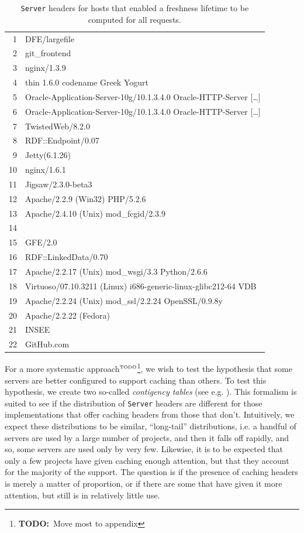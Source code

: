 \documentclass{llncs}
\newcommand{\httph}[1]{\texttt{#1}}
\newcommand{\todo}[1]{\ensuremath{^{\textrm{\tiny{TODO}\normalsize}}}\footnote{\textbf{TODO:}~#1}}
\begin{document}
\begin{table}[h]
  \caption{\httph{Server} headers for hosts that enabled a freshness
    lifetime to be computed for all requests.}\label{tab:servers}
\begin{center}
\begin{tabular}{rl}
  \hline
1 & DFE/largefile \\ 
  2 & git\_frontend \\ 
  3 & nginx/1.3.9 \\ 
  4 & thin 1.6.0 codename Greek Yogurt \\ 
  5 & Oracle-Application-Server-10g/10.1.3.4.0 Oracle-HTTP-Server [\ldots]\\
  6 & Oracle-Application-Server-10g/10.1.3.4.0 Oracle-HTTP-Server [\ldots]\\
  7 & TwistedWeb/8.2.0 \\ 
  8 & RDF::Endpoint/0.07 \\ 
  9 & Jetty(6.1.26) \\ 
  10 & nginx/1.6.1 \\ 
  11 & Jigsaw/2.3.0-beta3 \\ 
  12 & Apache/2.2.9 (Win32) PHP/5.2.6 \\ 
  13 & Apache/2.4.10 (Unix) mod\_fcgid/2.3.9 \\ 
  14 &  \\ 
  15 & GFE/2.0 \\ 
  16 & RDF::LinkedData/0.70 \\ 
  17 & Apache/2.2.17 (Unix) mod\_wsgi/3.3 Python/2.6.6 \\ 
  18 & Virtuoso/07.10.3211 (Linux) i686-generic-linux-glibc212-64  VDB \\ 
  19 & Apache/2.2.24 (Unix) mod\_ssl/2.2.24 OpenSSL/0.9.8y \\ 
  20 & Apache/2.2.22 (Fedora) \\ 
  21 & INSEE \\ 
  22 & GitHub.com \\ 
   \hline
\end{tabular}
\end{center}
\end{table}

For a more systematic approach\todo{Move most to appendix}, we wish to test the hypothesis that
some servers are better configured to support caching than others. To
test this hypothesis, we create two so-called \emph{contigency
  tables} (see e.g. \cite{kn:bj}). This formalism is suited to see if the
distribution of  \httph{Server} headers are different for those implementations that
offer caching headers from those that don't. Intuitively, we expect
these distributions to be similar, ``long-tail'' distributions, i.e. a
handful of servers are used by a large number of projects, and then it
falls off rapidly, and so, some servers are used only by very
few. Likewise, it is to be expected that only a few projects have
given caching enough attention, but that they account for the majority
of the support. The question is if the presence of caching headers is
merely a matter of proportion, or if there are some that have given it
more attention, but still is in relatively little use.
\end{document}
